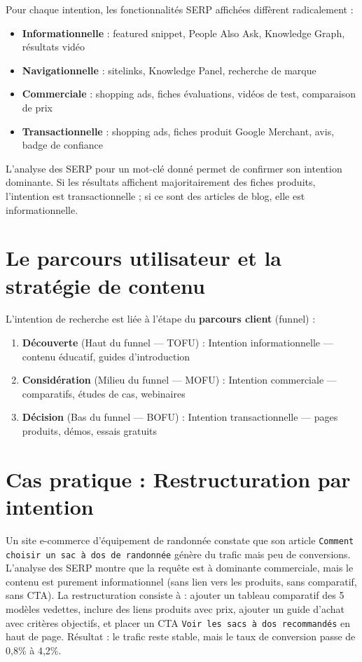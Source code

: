 \documentclass[12pt,a4paper,twoside]{report}
\newcommand{\keyword}[1]{\textbf{\textcolor{googleblue}{#1}}}
\begin{document}
Pour chaque intention, les fonctionnalités SERP affichées diffèrent radicalement :

\begin{itemize}
    \item \textbf{Informationnelle} : featured snippet, People Also Ask, Knowledge Graph, résultats vidéo
    \item \textbf{Navigationnelle} : sitelinks, Knowledge Panel, recherche de marque
    \item \textbf{Commerciale} : shopping ads, fiches évaluations, vidéos de test, comparaison de prix
    \item \textbf{Transactionnelle} : shopping ads, fiches produit Google Merchant, avis, badge de confiance
\end{itemize}

L'analyse des SERP pour un mot-clé donné permet de confirmer son intention dominante. Si les résultats affichent majoritairement des fiches produits, l'intention est transactionnelle ; si ce sont des articles de blog, elle est informationnelle.

\section{Le parcours utilisateur et la stratégie de contenu}

L'intention de recherche est liée à l'étape du \keyword{parcours client} (funnel) :

\begin{enumerate}
    \item \textbf{Découverte} (Haut du funnel --- TOFU) : Intention informationnelle --- contenu éducatif, guides d'introduction
    \item \textbf{Considération} (Milieu du funnel --- MOFU) : Intention commerciale --- comparatifs, études de cas, webinaires
    \item \textbf{Décision} (Bas du funnel --- BOFU) : Intention transactionnelle --- pages produits, démos, essais gratuits
\end{enumerate}

\section{Cas pratique : Restructuration par intention}

Un site e-commerce d'équipement de randonnée constate que son article \texttt{Comment choisir un sac à dos de randonnée} génère du trafic mais peu de conversions. L'analyse des SERP montre que la requête est à dominante commerciale, mais le contenu est purement informationnel (sans lien vers les produits, sans comparatif, sans CTA). La restructuration consiste à : ajouter un tableau comparatif des 5 modèles vedettes, inclure des liens produits avec prix, ajouter un guide d'achat avec critères objectifs, et placer un CTA \texttt{Voir les sacs à dos recommandés} en haut de page. Résultat : le trafic reste stable, mais le taux de conversion passe de 0,8\% à 4,2\%.
\end{document}
